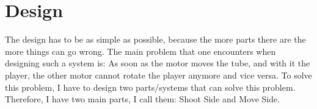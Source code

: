 \section{Design}\label{sec:design}
The design has to be as simple as possible, because the more parts there are the more things can go wrong.
The main problem that one encounters when designing such a system is:
As soon as the motor moves the tube, and with it the player, the other motor cannot rotate the player anymore and vice versa.
To solve this problem, I have to design two parts/systems that can solve this problem.
Therefore, I have two main parts, I call them: Shoot Side and Move Side.

